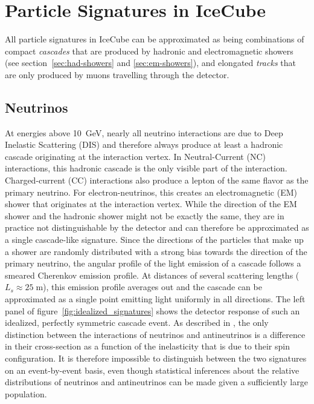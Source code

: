 \section{Particle Signatures in IceCube}
\label{sec:particle-signatures}
All particle signatures in IceCube can be approximated as being combinations of compact \emph{cascades} that are produced by hadronic and electromagnetic showers (see section~\ref{sec:had-showers} and \ref{sec:em-showers}), and elongated \emph{tracks} that are only produced by muons travelling through the detector.

\subsection{Neutrinos}

At energies above 10~GeV, nearly all neutrino interactions are due to Deep Inelastic Scattering (DIS) and therefore always produce at least a hadronic cascade originating at the interaction vertex.
In Neutral-Current (NC) interactions, this hadronic cascade is the only visible part of the interaction.
Charged-current (CC) interactions also produce a lepton of the same flavor as the primary neutrino.
For electron-neutrinos, this creates an electromagnetic (EM) shower that originates at the interaction vertex.
While the direction of the EM shower and the hadronic shower might not be exactly the same, they are in practice not distinguishable by the detector and can therefore be approximated as a single cascade-like signature.
Since the directions of the particles that make up a shower are randomly distributed with a strong bias towards the direction of the primary neutrino, the angular profile of the light emission of a cascade follows a smeared Cherenkov emission profile.
At distances of several scattering lengths ($L_s\approx25\;\mathrm{m}$), this emission profile averages out and the cascade can be approximated as a single point emitting light uniformly in all directions.
The left panel of figure~\ref{fig:idealized_signatures} shows the detector response of such an idealized, perfectly symmetric cascade event.
As described in , the only distinction between the interactions of neutrinos and antineutrinos is a difference in their cross-section as a function of the inelasticity that is due to their spin configuration.
It is therefore impossible to distinguish between the two signatures on an event-by-event basis, even though statistical inferences about the relative distributions of neutrinos and antineutrinos can be made given a sufficiently large population.
